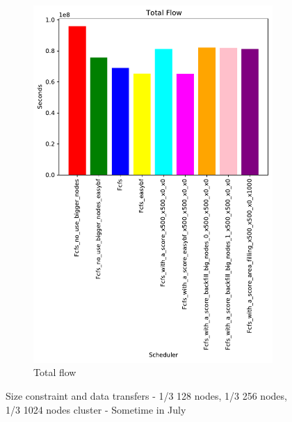 \documentclass[a4paper]{article}
\begin{document}
\begin{figure}[H]
\begin{subfigure}[b]{0.4\linewidth}\centering\includegraphics[width=1\linewidth]{MBSS/plot/Results_Size_And_Data_2022-01-24->2022-01-24_Total_flow_162_128_162_256_162_1024.pdf}\caption{Total flow}\label{25}\end{subfigure}
\caption{Size constraint and data transfers - 1/3 128 nodes, 1/3 256 nodes, 1/3 1024 nodes cluster - Sometime in July}\label{26}\end{figure}
\end{document}
